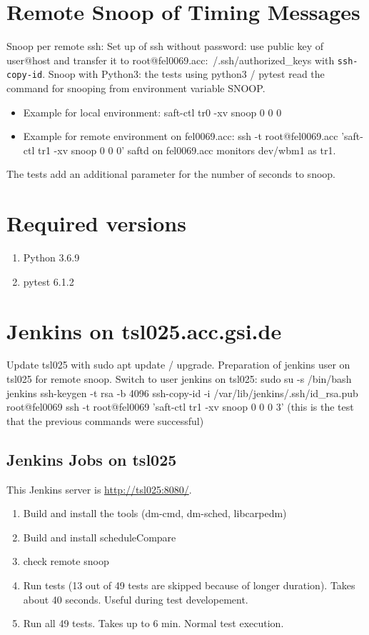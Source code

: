 \documentclass[12pt,a4paper]{report}
\begin{document}
\section{Remote Snoop of Timing Messages}
Snoop per remote ssh: Set up of ssh without password: use public key of user@host and transfer it to root@fel0069.acc:~/.ssh/authorized\_keys with \texttt{ssh-copy-id}.
Snoop with Python3: the tests using python3 / pytest read the command for snooping from environment variable SNOOP.
\begin{itemize}
\item Example for local environment: saft-ctl tr0 -xv snoop 0 0 0
\item Example for remote environment on fel0069.acc: ssh -t root@fel0069.acc 'saft-ctl tr1 -xv snoop 0 0 0' \linebreak
saftd on fel0069.acc monitors dev/wbm1 as tr1.
\end{itemize}
The tests add an additional parameter for the number of seconds to snoop.

\section{Required versions}
\begin{enumerate}
\item Python 3.6.9
\item pytest 6.1.2
\end{enumerate}

\section{Jenkins on tsl025.acc.gsi.de}
Update tsl025 with sudo apt update / upgrade.
Preparation of jenkins user on tsl025 for remote snoop.
\linebreak Switch to user jenkins on tsl025:
\linebreak sudo su -s /bin/bash jenkins
\linebreak ssh-keygen -t rsa -b 4096
\linebreak ssh-copy-id -i /var/lib/jenkins/.ssh/id\_rsa.pub root@fel0069
\linebreak ssh -t root@fel0069 'saft-ctl tr1 -xv snoop 0 0 0 3' (this is the test that the previous commands were successful)

\subsection{Jenkins Jobs on tsl025}
This Jenkins server is \url{http://tsl025:8080/}.
\begin{enumerate}
\item Build and install the tools (dm-cmd, dm-sched, libcarpedm)
\item Build and install scheduleCompare
\item check remote snoop
\item Run tests (13 out of 49 tests are skipped because of longer duration). Takes about 40 seconds. Useful during test developement.
\item Run all 49 tests. Takes up to 6 min. Normal test execution.
\end{enumerate}
\end{document}
